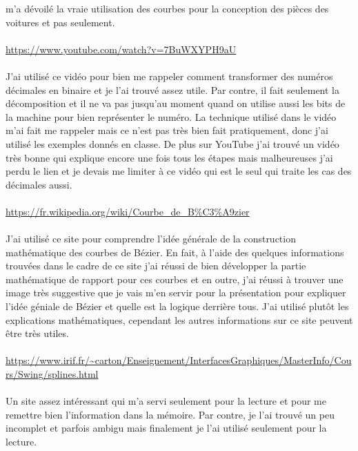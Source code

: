 \documentclass{article}
\begin{document}
m'a d\'{e}voil\'{e} la vraie utilisation des courbes pour la conception des pi\`{e}ces des voitures et pas
seulement.
\\\\
{\color{blue}
\url{https://www.youtube.com/watch?v=7BuWXYPH9aU}} 
\\\\
J'ai utilis\'{e} ce vid\'{e}o pour bien me rappeler comment transformer des num\'{e}ros d\'{e}cimales en binaire et
je l'ai trouv\'{e} assez utile. Par contre, il fait seulement la d\'{e}composition et il ne va pas jusqu'au
moment quand on utilise aussi les bits de la machine pour bien repr\'{e}senter le num\'{e}ro. La technique
utilis\'{e} dans le vid\'{e}o m'ai fait me rappeler mais ce n'est pas tr\`{e}s bien fait pratiquement, donc j'ai
utilis\'{e} les exemples donn\'{e}s en classe. De plus sur YouTube j'ai trouv\'{e} un vid\'{e}o tr\`{e}s bonne qui
explique encore une fois tous les \'{e}tapes mais malheureuses j'ai perdu le lien et je devais me limiter \`{a}
ce vid\'{e}o qui est le seul qui traite les cas des d\'{e}cimales aussi.
\\\\
{\color{blue}
\url{https://fr.wikipedia.org/wiki/Courbe_de_B%C3%A9zier}} 
\\\\
J'ai utilis\'{e} ce site pour comprendre l'id\'{e}e g\'{e}n\'{e}rale de la construction math\'{e}matique des courbes de
B\'{e}zier. En fait, \`{a} l'aide des quelques informations trouv\'{e}es dans le cadre de ce site j'ai r\'{e}ussi de bien
d\'{e}velopper la partie math\'{e}matique de rapport pour ces courbes et en outre, j'ai r\'{e}ussi \`{a} trouver une
image tr\`{e}s suggestive que je vais m'en servir pour la pr\'{e}sentation pour expliquer l'id\'{e}e g\'{e}niale de
B\'{e}zier et quelle est la logique derri\`{e}re tous. J'ai utilis\'{e} plut\^{o}t les explications math\'{e}matiques,
cependant les autres informations sur ce site peuvent \^{e}tre tr\`{e}s utiles.
\\\\
{\color{blue}
\url{https://www.irif.fr/~carton/Enseignement/InterfacesGraphiques/MasterInfo/Cours/Swing/splines.html}} 
\\\\
Un site assez int\'{e}ressant qui m'a servi seulement pour la lecture et pour me remettre bien
l'information dans la m\'{e}moire. Par contre, je l'ai trouv\'{e} un peu incomplet et parfois ambigu mais
finalement je l'ai utilis\'{e} seulement pour la lecture.
\\\\
\end{document}
